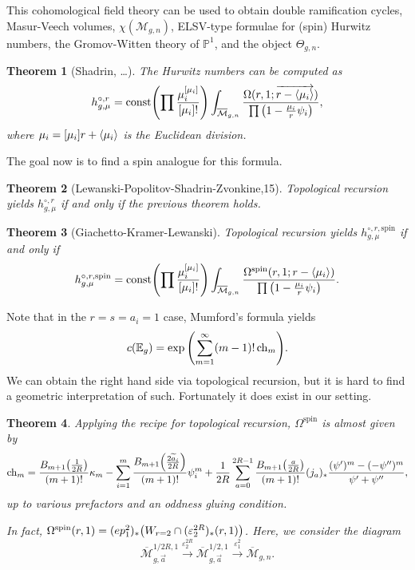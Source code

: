 \documentclass[leqno, openany]{memoir}
\newtheorem{thm}{Theorem}[section]
\theoremstyle{definition}
\theoremstyle{remark}
\theoremstyle{plain}
\theoremstyle{definition}
\theoremstyle{remark}
\renewcommand{\P}{\mathbb{P}}
\newcommand{\ep}{\varepsilon}
\newcommand{\mc}[1]{\mathcal{#1}}
\newcommand{\mr}[1]{\mathrm{#1}}
\newcommand{\on}[1]{\operatorname{#1}}
\newcommand{\ol}[1]{\overline{#1}}
\newcommand{\wt}[1]{\widetilde{#1}}
\begin{document}
This cohomological field theory can be used to obtain double ramification cycles, Masur-Veech volumes, $\chi(\mc{M}_{g,n})$, ELSV-type formulae for (spin) Hurwitz numbers, the Gromov-Witten theory of $\P^1$, and the object $\Theta_{g,n}$.

\begin{thm}[Shadrin, \ldots]
  The Hurwitz numbers can be computed as
  \[ h_{g,\mu}^{\circ, r} = \mr{const} \qty(\prod \frac{\mu_i^{[\mu_i]}}{[\mu_i]!}) \int_{\ol{\mc{M}}_{g,n}} \frac{\Omega(r,1;\overrightarrow{ r-\ev{\mu_i} })}{\prod \qty(1-\frac{\mu_i}{r} \psi_i)}, \]
  where $\mu_i = [\mu_i] r + \ev{\mu_i}$ is the Euclidean division.
\end{thm}
The goal now is to find a spin analogue for this formula.
\begin{thm}[Lewanski-Popolitov-Shadrin-Zvonkine,15]
Topological recursion yields $h_{g,\mu}^{\circ, r}$ if and only if the previous theorem holds.
\end{thm}

\begin{thm}[Giachetto-Kramer-Lewanski]\label{thm:gkl}
Topological recursion yields $h_{g,\mu}^{\circ, r, \mr{spin}}$ if and only if
  \[ h_{g,\mu}^{\circ, r,\mr{spin}} = \mr{const} \qty(\prod \frac{\mu_i^{[\mu_i]}}{[\mu_i]!}) \int_{\ol{\mc{M}}_{g,n}} \frac{\Omega^{\mr{spin}}(r,1;r-\ev{\mu_i})}{\prod \qty(1-\frac{\mu_i}{r} \psi_i)}. \]
\end{thm}

Note that in the $r=s=a_i=1$ case, Mumford's formula yields
\[ c(\mathbb{E}_g) = \exp\qty(\sum_{m=1}^{\infty} (m-1)! \on{ch}_m). \]
We can obtain the right hand side via topological recursion, but it is hard to find a geometric interpretation of such. Fortunately it does exist in our setting.

\begin{thm}
  Applying the recipe for topological recursion, $\Omega^{\mr{spin}}$ is almost given by
\[ \on{ch}_m = \frac{B_{m+1}\qty(\frac{1}{2R})}{(m+1)!} \kappa_m - \sum_{i=1}^m \frac{B_{m+1}\qty(\frac{2\wt{a}_i}{2R})}{(m+1)!} \psi_i^m + \frac{1}{2R} \sum_{a=0}^{2R-1} \frac{B_{m+1}\qty(\frac{a}{2R})}{(m+1)!} (j_a)_* \frac{(\psi')^m - (-\psi'')^m}{\psi' + \psi''}, \]
up to various prefactors and an oddness gluing condition.

In fact, $\Omega^{\mr{spin}}(r,1) = (ep_{1}^2)_* \qty( W_{r=2} \cap(\ep_2^{2R})_*(r,1) )$. Here, we consider the diagram
\[ \ol{\mc{M}}_{g,\vec{a}}^{1/2R,1} \xrightarrow{\ep_2^{2R}} \ol{\mc{M}}_{g,\vec{a}}^{1/2,1} \xrightarrow{\ep_1^2} \ol{\mc{M}}_{g,n}. \]
\end{thm}
\end{document}
